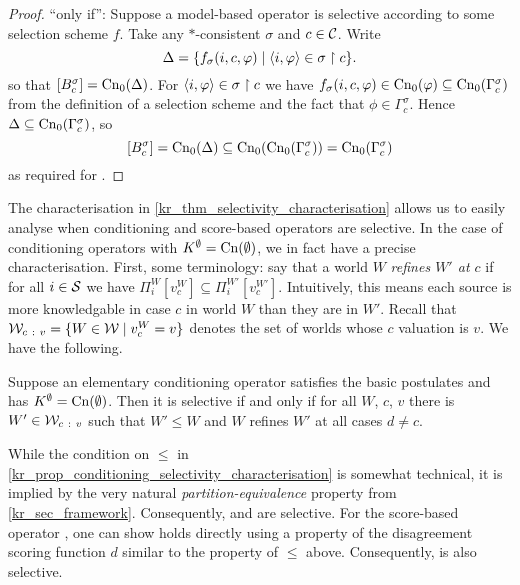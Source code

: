 \begin{proof}
    ``only if'': Suppose a model-based operator is selective according to some
    selection scheme $f$. Take any $\ast$-consistent $\sigma$ and $c \in \mathcal{C}$.
    Write
    \[
        \Delta = \{
            f_\sigma(i, c, \varphi)
            \mid
            \langle {i, \varphi} \rangle \in \sigma \upharpoonright c
        \}.
    \]
    so that $\left[{B^\sigma_c}\right] = \operatorname{Cn}_0(\Delta)$. For $\langle {i, \varphi} \rangle \in
    \sigma \upharpoonright c$ we have $f_\sigma(i, c, \varphi) \in \operatorname{Cn}_0(\varphi) \subseteq
    \operatorname{Cn}_0(\Gamma^\sigma_c)$ from the definition of a selection scheme and the
    fact that $\phi \in \Gamma^\sigma_c$. Hence $\Delta \subseteq
    \operatorname{Cn}_0(\Gamma^\sigma_c)$, so
    \[
        \left[{B^\sigma_c}\right]
        = \operatorname{Cn}_0(\Delta)
        \subseteq \operatorname{Cn}_0(\operatorname{Cn}_0(\Gamma^\sigma_c))
        = \operatorname{Cn}_0(\Gamma^\sigma_c)
    \]
    as required for \boundedness{}.
\end{proof}

The characterisation in \cref{kr_thm_selectivity_characterisation} allows us to
easily analyse when conditioning and score-based operators are selective. In
the case of conditioning operators with $K^\emptyset = \operatorname{Cn}(\emptyset)$, we in
fact have a precise characterisation. First, some terminology: say that a world
$W$ \emph{refines $W'$ at $c$} if for all $i \in \mathcal{S}$ we have $\Pi^W_i[v^W_c]
\subseteq \Pi^{W'}_i[v^{W'}_c]$. Intuitively, this means each source is more
knowledgable in case $c$ in world $W$ than they are in $W'$. Recall that $\mathcal{W}_{c\ :\
v} = \{W \in \mathcal{W} \mid v^W_c = v\}$ denotes the set of worlds whose $c$ valuation is
$v$. We have the following.

\begin{proposition}
    \label{kr_prop_conditioning_selectivity_characterisation}
    Suppose an elementary conditioning operator satisfies the basic postulates
    and has $K^\emptyset = \operatorname{Cn}(\emptyset)$. Then it is selective if and only if
    for all $W$, $c$, $v$ there is $W' \in \mathcal{W}_{c\ :\ v}$ such that $W' \le W$
    and $W$ refines $W'$ at all cases $d \ne c$.
\end{proposition}

While the condition on $\le$ in
\cref{kr_prop_conditioning_selectivity_characterisation} is somewhat technical, it
is implied by the very natural \emph{partition-equivalence} property from
\cref{kr_sec_framework}. Consequently, \varbasedcond{} and \partbasedcond{} are
selective. For the score-based operator \scorebasedop{}, one can show
\boundedness{} holds directly using a property of the disagreement scoring
function $d$ similar to the property of $\le$ above. Consequently,
\scorebasedop{} is also selective.

